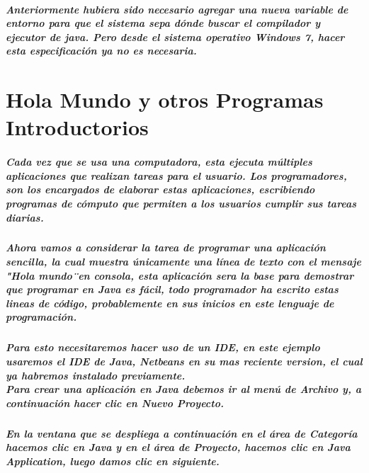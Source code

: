 \documentclass[12pt]{book} %
\begin{document}
\paragraph{Anteriormente hubiera sido necesario agregar una nueva variable de entorno para que el sistema sepa dónde buscar el compilador y ejecutor de java. Pero desde el sistema operativo Windows 7, hacer esta especificación ya no es necesaria.}


\chapter{Hola Mundo y otros Programas Introductorios}

\paragraph{Cada vez que se usa una computadora, esta ejecuta múltiples aplicaciones que realizan tareas para el usuario. Los programadores, son los encargados de elaborar estas aplicaciones, escribiendo programas de cómputo que permiten a los usuarios cumplir sus tareas diarias.}
\paragraph{Ahora vamos a considerar la tarea de programar una aplicación sencilla, la cual muestra únicamente una línea de texto con el mensaje "Hola mundo\" \ en consola, esta aplicación sera la base para demostrar que programar en Java es fácil, todo programador ha escrito estas lineas de código, probablemente en sus inicios en este lenguaje de programación.}
\paragraph{Para esto necesitaremos hacer uso de un IDE, en este ejemplo usaremos el IDE de Java, Netbeans en su mas reciente version, el cual ya habremos instalado previamente. \\Para crear una aplicación en Java debemos ir al menú de Archivo y, a continuación hacer clic en Nuevo Proyecto.}

\paragraph{En la ventana que se despliega a continuación en el área de Categoría hacemos clic en Java y en el área de Proyecto, hacemos clic en Java Application, luego damos clic en siguiente.}
\end{document}
